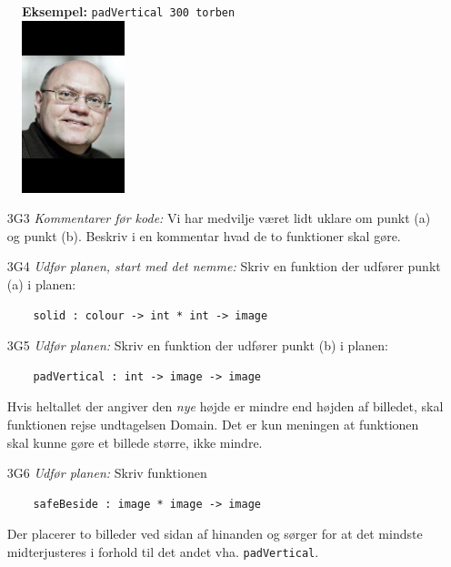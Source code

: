\documentclass[a4paper,12pt]{article}
\begin{document}
\begin{figure}[h!]
  \centering
\textbf{Eksempel:} \verb|padVertical 300 torben|\\
\vspace{2mm}
  \includegraphics[width=3cm]{uge3_paddedTorben.png}
  \label{fig:padVertical}
\end{figure}

\begin{enumerate}
\item[3G3] \textit{Kommentarer før kode:} Vi har medvilje været lidt uklare
  om punkt (a) og punkt (b). Beskriv i en kommentar hvad de to
  funktioner skal gøre.

\item[3G4] \textit{Udfør planen, start med det nemme:} Skriv en funktion
  der udfører punkt (a) i planen:
  \begin{lstlisting}
    solid : colour -> int * int -> image
  \end{lstlisting}

\item[3G5] \textit{Udfør planen:} Skriv en funktion der udfører punkt (b) i planen:
  \begin{lstlisting}
    padVertical : int -> image -> image
  \end{lstlisting}
  Hvis heltallet der angiver den \textit{nye} højde er mindre end
  højden af billedet, skal funktionen rejse undtagelsen Domain. Det er
  kun meningen at funktionen skal kunne gøre et billede større, ikke mindre.

\item[3G6] \textit{Udfør planen:} Skriv funktionen
  \begin{lstlisting}
    safeBeside : image * image -> image
  \end{lstlisting}
  Der placerer to billeder ved sidan af hinanden og sørger for at det
  mindste midterjusteres i forhold til det andet
  vha. \verb|padVertical|.

\end{enumerate}
\end{document}
